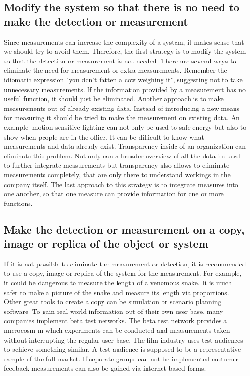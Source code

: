 \subsection[Eliminate the need for measurement]{Modify the system so that there is no need to make the detection or measurement}

Since measurements can increase the complexity of a system, it makes sense that we should try to avoid them.
Therefore, the first strategy is to modify the system so that the detection or measurement is not needed.
There are several ways to eliminate the need for measurement or extra measurements.
Remember the idiomatic expression "you don't fatten a cow weighing it", suggesting not to take unnecessary measurements.
If the information provided by a measurement has no useful function, it should just be eliminated.
Another approach is to make measurements out of already existing data.
Instead of introducing a new means for measuring it should be tried to make the measurement on existing data.
An example: motion-sensitive lighting can not only be used to safe energy but also to show when people are in the office.
It can be difficult to know what measurements and data already exist.
Transparency inside of an organization can eliminate this problem.
Not only can a broader overview of all the data be used to further integrate measurements but transparency also allows to eliminate measurements completely, that are only there to understand workings in the company itself.
The last approach to this strategy is to integrate measures into one another, so that one measure can provide information for one or more functions.


\subsection[Measure on copy]{Make the detection or measurement on a copy, image or replica of the object or system}

If it is not possible to eliminate the measurement or detection, it is recommended to use a copy, image or replica of the system for the measurement.
For example, it could be dangerous to measure the length of a venomous snake.
It is much safer to make a picture of the snake and measure its length via proportions.
Other great tools to create a copy can be simulation or scenario planning software.
To gain real world information out of their own user base, many companies implement beta test networks.
The beta test network provides a microcosm in which experiments can be conducted and measurements taken without interrupting the regular user base.
The film industry uses test audiences to achieve something similar.
A test audience is supposed to be a representative sample of the full market.
If separate groups can not be implemented customer feedback measurements can also be gained via internet-based forms.


